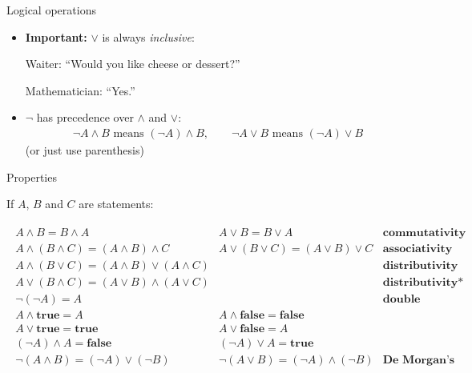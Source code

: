 \documentclass[11pt]{beamer}
\theoremstyle{definition}
\begin{document}
\begin{frame}{Logical operations}
\begin{itemize}
  \item \textbf{Important:} $\lor$ is always \emph{inclusive}:
   \pause

\begin{center}
\begin{example}
Waiter: ``Would you like cheese or dessert?''

Mathematician: ``Yes.''
\end{example}
\end{center}
\pause
 \item $\neg$ has precedence over $\land$ and $\lor$:
    \begin{align*}
      \neg A\land B \text{ means } (\neg A)\land B,\qquad
      \neg A\lor B \text{ means } (\neg A)\lor B
    \end{align*}
    (or just use parenthesis)
\end{itemize}


\end{frame}

\begin{frame}{Properties}
  \begin{center}
    If $A$, $B$ and $C$ are statements:
  \end{center}
  {\fontsize{9}{17}\selectfont
  \begin{align*}
    \begin{array}{cc|c}
      A\land B = B\land A & A \lor B = B\lor A &\textbf{commutativity}\\
      \hline
      A\land (B\land C) = (A\land B)\land C \quad &
      A\lor (B\lor C) = (A\lor B)\lor C & \textbf{associativity}\\
      \hline
      A\land(B\lor C) = (A\land B)\lor(A\land C) & & \textbf{distributivity} \\
      A\lor(B\land C) = (A\lor B)\land(A\lor C) & &\textbf{distributivity*}  \\
      \hline
      \neg(\neg A) = A & & \textbf{double negation} \\
      \hline
      A \land \textbf{true} = A & A \land \textbf{false} = \textbf{false} \\
      A\lor \textbf{true} = \textbf{true} & A \lor \textbf{false} = A \\
      (\neg A) \land A = \textbf{false} & (\neg A) \lor A = \textbf{true} \\
      \hline
      \neg (A\land B) = (\neg A)\lor (\neg B) &
      \neg (A\lor B) = (\neg A)\land (\neg B) & \textbf{De Morgan's laws}
    \end{array}
  \end{align*}}
\end{frame}
\end{document}
